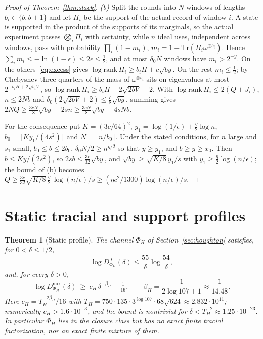 \documentclass[11pt,a4paper]{article}
\theoremstyle{plain}
\newtheorem{theorem}{Theorem}[section]
\theoremstyle{definition}
\theoremstyle{remark}
\newcommand{\Dmix}{D^{\mathrm{mix}}}
\newcommand{\DChoi}{D^{J}}
\begin{document}
\begin{proof}[Proof of Theorem~\ref{thm:slack}]
\emph{(b)} Split the rounds into $N$ windows of lengths $b_i\in\{b,b+1\}$ and let $\Pi_i$ be the support of the actual record of
window $i$. A state is supported in the product of the supports of its marginals, so the actual experiment passes
$\bigotimes_i\Pi_i$ with certainty, while $n$ ideal uses, independent across windows, pass with probability $\prod_i(1-m_i)$,
$m_i=1-\mathrm{Tr}(\Pi_i\omega^{\otimes b_i})$. Hence $\sum_im_i\le-\ln(1-\epsilon)\le2\epsilon\le\frac12$, and at most $\delta_0N$ windows have
$m_i>2^{-y}$. On the others~\eqref{eq:excess} gives $\log\mathrm{rank}\,\Pi_i\ge b_iH+c\sqrt{by}$. On the rest $m_i\le\frac12$; by Chebyshev
three quarters of the mass of $\omega^{\otimes b_i}$ sits on eigenvalues at most $2^{-b_iH+2\sqrt{b_iV}}$, so $\log\mathrm{rank}\,\Pi_i\ge
b_iH-2\sqrt{2bV}-2$. With $\log\mathrm{rank}\,\Pi_i\le2(Q+J_i)$, $n\le2Nb$ and $\delta_0(2\sqrt{2bV}+2)\le\frac c8\sqrt{by}$, summing gives
$2NQ\ge\frac{3cN}8\sqrt{by}-2sn\ge\frac{3cN}8\sqrt{by}-4sNb$.

For the consequence put $K=(3c/64)^2$, $y_1=\log(1/\epsilon)+\frac\eta2\log n$, $b_0=\lfloor Ky_1/(4s^2)\rfloor$ and $N=\lfloor n/b_0\rfloor$. Under
the stated conditions, for $n$ large and $s_1$ small, $b_0\le b\le2b_0$, $\delta_0N/2\ge n^{\eta/2}$ so that $y\ge y_1$, and
$b\ge y\ge x_0$. Then $b\le Ky/(2s^2)$, so $2sb\le\frac{3c}{32}\sqrt{by}$, and $\sqrt{by}\ge\sqrt{K/8}\,y_1/s$ with $y_1\ge\frac\eta2\log(n/\epsilon)$; the
bound of (b) becomes $Q\ge\frac{3c}{32}\sqrt{K/8}\,\frac\eta2\,\log(n/\epsilon)/s\ge(\eta c^2/1300)\log(n/\epsilon)/s$.
\end{proof}


\section{Static tracial and support profiles}\label{app:static}


\begin{theorem}[Static profile]\label{thm:profile}
The channel $\Phi_H$ of Section~\ref{sec:houghton} satisfies, for $0<\delta\le1/2$,
\[
\log\DChoi_{\Phi_H}(\delta)\le\frac{55}{\delta}\log\frac{54}{\delta},
\]
and, for every $\delta>0$,
\[
\log\Dmix_{\Phi_H}(\delta)\ \ge\ c_H\,\delta^{-\beta_H}-\tfrac1{16},\qquad\beta_H=\frac1{2\log107+1}\approx\frac1{14.48}.
\]
Here $c_H=T_H^{-2\beta_H}/16$ with $T_H=750\cdot135\cdot3^{\log107}\cdot68\sqrt{624}\approx2.832\cdot10^{11}$; numerically $c_H>1.6\cdot10^{-3}$,
and the bound is nontrivial for $\delta<T_H^{-2}\approx1.25\cdot10^{-23}$. In particular $\Phi_H$ lies in the closure class but has no
exact finite tracial factorization, nor an exact finite mixture of them.
\end{theorem}
\end{document}
